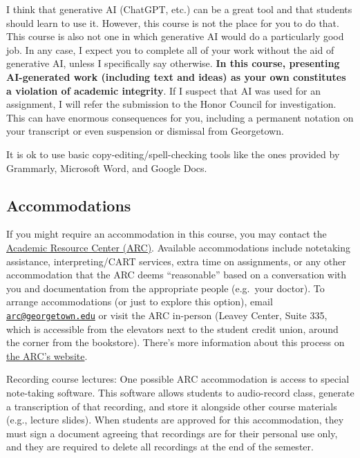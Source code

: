 \documentclass[
  letterpaper,
  DIV=11,
  numbers=noendperiod]{scrartcl}
\begin{document}
I think that generative AI (ChatGPT, etc.) can be a great tool and that
students should learn to use it. However, this course is not the place
for you to do that. This course is also not one in which generative AI
would do a particularly good job. In any case, I expect you to complete
all of your work without the aid of generative AI, unless I specifically
say otherwise. \textbf{In this course, presenting AI-generated work
(including text and ideas) as your own constitutes a violation of
academic integrity}. If I suspect that AI was used for an assignment, I
will refer the submission to the Honor Council for investigation. This
can have enormous consequences for you, including a permanent notation
on your transcript or even suspension or dismissal from Georgetown.

It is ok to use basic copy-editing/spell-checking tools like the ones
provided by Grammarly, Microsoft Word, and Google Docs.

\subsection{\texorpdfstring{\textbf{Accommodations}}{Accommodations}}\label{accommodations}

If you might require an accommodation in this course, you may contact
the \href{https://academicsupport.georgetown.edu/}{Academic Resource
Center (ARC)}. Available accommodations include notetaking assistance,
interpreting/CART services, extra time on assignments, or any other
accommodation that the ARC deems ``reasonable'' based on a conversation
with you and documentation from the appropriate people (e.g.~your
doctor). To arrange accommodations (or just to explore this option),
email \href{mailto:arc@georgetown.edu}{\nolinkurl{arc@georgetown.edu}}
or visit the ARC in-person (Leavey Center, Suite 335, which is
accessible from the elevators next to the student credit union, around
the corner from the bookstore). There's more information about this
process on \href{https://academicsupport.georgetown.edu/disability/}{the
ARC's website}.

Recording course lectures: One possible ARC accommodation is access to
special note-taking software. This software allows students to
audio-record class, generate a transcription of that recording, and
store it alongside other course materials (e.g., lecture slides). When
students are approved for this accommodation, they must sign a document
agreeing that recordings are for their personal use only, and they are
required to delete all recordings at the end of the semester.
\end{document}

